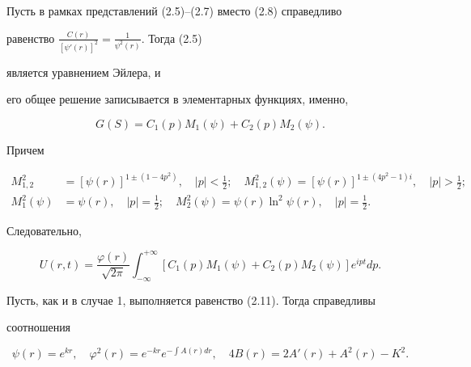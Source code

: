  


\begin{case} 


Пусть в рамках представлений (2.5)--(2.7) вместо (2.8) справедливо 


равенство $\frac{C(r)}{[\psi'(r)]^2}=\frac{1}{\psi^2(r)}$. Тогда (2.5) 


является уравнением Эйлера, и 


его общее решение записывается в элементарных функциях, именно, 


\begin{equation} 


G(S)=C_1(p)M_1(\psi)+C_2(p)M_2(\psi). 


\end{equation} 


Причем 


\begin{equation} 


\begin{split} 


M^2_{1,2}&=[\psi(r)]^{1\pm(1-4p^2)},\quad |p|<\frac{1}{2};\quad 


M^2_{1,2}(\psi)=[\psi(r)]^{1\pm(4p^2-1)i},\quad |p|>\frac{1}{2}; \\ 


M^2_1(\psi)&=\psi(r),\quad |p|=\frac{1}{2};\quad 


M^2_2(\psi)=\psi(r)\ln^2\psi(r),\quad |p|=\frac{1}{2}. 


\end{split} 


\end{equation} 


Следовательно, 


\begin{equation} 


U(r,t)=\frac{\varphi(r)}{\sqrt{2\pi}}\int^{+\infty}_{-\infty} 


[C_1(p)M_1(\psi)+C_2(p)M_2(\psi)]e^{ipt}dp. 


\end{equation} 


\end{case} 


 


Пусть, как и в случае 1, выполняется равенство (2.11). Тогда справедливы 


соотношения 


\begin{equation} 


\psi(r)=e^{kr},\quad \varphi^2(r)=e^{-kr} 


e^{-\int A(r)dr},\quad 4B(r)=2A'(r)+A^2(r)-K^2. 


\end{equation} 


